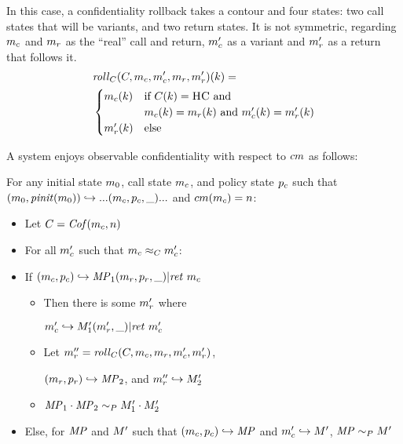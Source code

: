 \documentclass[acmsmall,review,anonymous]{acmart}\settopmatter{printfolios=true,printccs=false,printacmref=false}
\begin{document}
      In this case, a confidentiality rollback takes a contour and four states: two call states
      that will be variants, and two return states. It is not symmetric, regarding \(m_c\) and \(m_r\)
      as the ``real'' call and return, \(m_c'\) as a variant and \(m_r'\) as a return that follows it.
      \[\begin{split}
        & \mathit{roll}_C(C,m_c,m_c',m_r,m_r')(k) = \\
        & \begin{cases}
          m_c(k) & \text{if } C(k) = \textsc{HC} \text{ and } \\
                  & m_c(k) = m_r(k) \text{ and }
                    m_c'(k) = m_r'(k) \\
          m_r'(k) & \text{else} \\
        \end{cases}
      \end{split}\]

      A system enjoys observable confidentiality with respect to \(cm\) as follows:

      For any initial state \(m_0\), call state \(m_c\), and policy state \(p_c\) such that
      \((m_0,\mathit{pinit}(m_0)) \hookrightarrow ... (m_c,p_c,\_) ...\) and
      \(cm(m_c) = n\):

      \begin{itemize}
        \item Let \(C = \mathit{Cof}(m_c,n)\)
        \item For all \(m_c'\) such that \(m_c \approx_C m_c'\):
        \item If \((m_c,p_c) \hookrightarrow \mathit{MP}_1 (m_r,p_r,\_) | \mathit{ret}\ m_c\)
          \begin{itemize}
            \item Then there is some \(m_r'\) where

              \(m_c' \hookrightarrow M_1' (m_r',\_) | \mathit{ret}\ m_c'\)
            \item Let \(m_r'' = \mathit{roll}_C(C,m_c,m_r,m_c',m_r')\),

              \((m_r,p_r) \hookrightarrow \mathit{MP}_2\), and \(m_r'' \hookrightarrow M_2'\)
            \item \(\mathit{MP}_1 \cdot \mathit{MP}_2 \sim_P M_1' \cdot M_2'\)
          \end{itemize}
        \item Else, for \(\mathit{MP}\) and \(M'\) such that \((m_c,p_c) \hookrightarrow \mathit{MP}\)
          and \(m_c' \hookrightarrow M'\), \(\mathit{MP} \sim_P M'\)
      \end{itemize}
\end{document}
